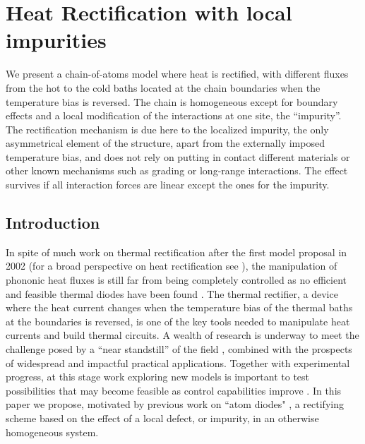 
\chapter{Heat Rectification with local impurities}
\label{Chapter4}
%
We present a chain-of-atoms model where heat is rectified, with different fluxes from the hot to the cold baths
located at the chain boundaries when the temperature bias is reversed. The chain is homogeneous except for boundary effects
and a local modification of the interactions
at one site, the ``impurity''. The rectification mechanism is due here to the localized impurity, the only asymmetrical element of the structure, apart from the externally imposed temperature bias,  and does not rely on putting in contact different materials or other known mechanisms such as grading or long-range interactions.  The effect survives if all interaction forces are linear except the ones for the impurity.
%
\newpage
%

\section{Introduction}

In spite of much work on thermal rectification
after the first model proposal in 2002 \cite{Terraneo2002} (for a broad perspective on heat rectification
see \cite{Roberts2011,Li2012}), the manipulation of phononic
heat fluxes is still far from being completely controlled as no efficient and feasible thermal diodes have been found \cite{Chen2015,Pereira2017}.
The thermal rectifier, a device where the heat
current changes when the temperature bias of the thermal baths at the boundaries is reversed,
is one of the key tools needed to manipulate heat currents and build thermal circuits.
A wealth of research is underway to meet the challenge posed by  a ``near standstill'' of the field \cite{Chen2015,Pereira2017},
combined with the prospects of widespread and impactful practical applications.
Together with experimental progress, at this stage work exploring new models is important to test possibilities that may become feasible as control capabilities improve \cite{Roberts2011}.
In this paper we propose,
motivated by previous work on ``atom diodes"  \cite{Ruschhaupt2004,Raizen2005}, a rectifying scheme
based on the effect of a local defect, or impurity,
in an otherwise homogeneous system.

